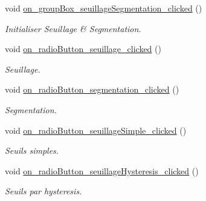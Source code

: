 \begin{DoxyCompactItemize}
\mbox{\label{classMainWindow_a550c0d329f7ddaef00162e5960e75d3d}} 
void \hyperlink{classMainWindow_a550c0d329f7ddaef00162e5960e75d3d}{on\+\_\+group\+Box\+\_\+seuillage\+Segmentation\+\_\+clicked} ()
\begin{DoxyCompactList}\small\item\em Initialiser Seuillage \& Segmentation. \end{DoxyCompactList}\item 
\mbox{\label{classMainWindow_a2674db4d7c9dca3608d7bba7e5c19712}} 
void \hyperlink{classMainWindow_a2674db4d7c9dca3608d7bba7e5c19712}{on\+\_\+radio\+Button\+\_\+seuillage\+\_\+clicked} ()
\begin{DoxyCompactList}\small\item\em Seuillage. \end{DoxyCompactList}\item 
\mbox{\label{classMainWindow_abcf9df73bb70a451ebec8981b9de97a5}} 
void \hyperlink{classMainWindow_abcf9df73bb70a451ebec8981b9de97a5}{on\+\_\+radio\+Button\+\_\+segmentation\+\_\+clicked} ()
\begin{DoxyCompactList}\small\item\em Segmentation. \end{DoxyCompactList}\item 
\mbox{\label{classMainWindow_acd3de1b1aba25842b7cd46f6b16a7e14}} 
void \hyperlink{classMainWindow_acd3de1b1aba25842b7cd46f6b16a7e14}{on\+\_\+radio\+Button\+\_\+seuillage\+Simple\+\_\+clicked} ()
\begin{DoxyCompactList}\small\item\em Seuils simples. \end{DoxyCompactList}\item 
\mbox{\label{classMainWindow_a86a77b82762aa811b0a89cc8be7ce59e}} 
void \hyperlink{classMainWindow_a86a77b82762aa811b0a89cc8be7ce59e}{on\+\_\+radio\+Button\+\_\+seuillage\+Hysteresis\+\_\+clicked} ()
\begin{DoxyCompactList}\small\item\em Seuils par hysteresis. \end{DoxyCompactList}\item 
\mbox{\label{classMainWindow_a8d42f39e072db3ba34dbd693fb3e03b1}} 

\end{DoxyCompactItemize}
